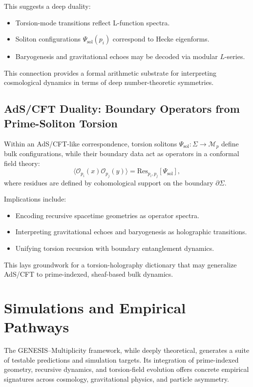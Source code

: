 \documentclass{article}
\theoremstyle{plain}
\begin{document}
This suggests a deep duality:
\begin{itemize}
    \item Torsion-mode transitions reflect L-function spectra.
    \item Soliton configurations $\Psi_{\text{sol}}(p_i)$ correspond to Hecke eigenforms.
    \item Baryogenesis and gravitational echoes may be decoded via modular $L$-series.
\end{itemize}

This connection provides a formal arithmetic substrate for interpreting cosmological dynamics in terms of deep number-theoretic symmetries.

\subsection{AdS/CFT Duality: Boundary Operators from Prime-Soliton Torsion}

Within an AdS/CFT-like correspondence, torsion solitons $\Psi_{\text{sol}}: \Sigma \rightarrow \mathcal{M}_p$ define bulk configurations, while their boundary data act as operators in a conformal field theory:
\[
\langle \mathcal{O}_{p_i}(x) \mathcal{O}_{p_j}(y) \rangle = \text{Res}_{p_i, p_j}[\Psi_{\text{sol}}],
\]
where residues are defined by cohomological support on the boundary $\partial \Sigma$.

Implications include:
\begin{itemize}
    \item Encoding recursive spacetime geometries as operator spectra.
    \item Interpreting gravitational echoes and baryogenesis as holographic transitions.
    \item Unifying torsion recursion with boundary entanglement dynamics.
\end{itemize}

This lays groundwork for a torsion-holography dictionary that may generalize AdS/CFT to prime-indexed, sheaf-based bulk dynamics.

\section{Simulations and Empirical Pathways}

The GENESIS–Multiplicity framework, while deeply theoretical, generates a suite of testable predictions and simulation targets. Its integration of prime-indexed geometry, recursive dynamics, and torsion-field evolution offers concrete empirical signatures across cosmology, gravitational physics, and particle asymmetry.
\end{document}
